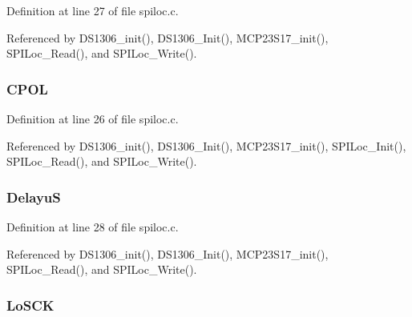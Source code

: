 Definition at line 27 of file spiloc.\-c.



Referenced by D\-S1306\-\_\-init(), D\-S1306\-\_\-\-Init(), M\-C\-P23\-S17\-\_\-init(), S\-P\-I\-Loc\-\_\-\-Read(), and S\-P\-I\-Loc\-\_\-\-Write().

\hypertarget{struct_s_p_i___loc___conf_ac02950660e371880e83d2ed7110e7d2f}{
\subsubsection[{C\-P\-O\-L}]{ C\-P\-O\-L}}\label{struct_s_p_i___loc___conf_ac02950660e371880e83d2ed7110e7d2f}


Definition at line 26 of file spiloc.\-c.



Referenced by D\-S1306\-\_\-init(), D\-S1306\-\_\-\-Init(), M\-C\-P23\-S17\-\_\-init(), S\-P\-I\-Loc\-\_\-\-Init(), S\-P\-I\-Loc\-\_\-\-Read(), and S\-P\-I\-Loc\-\_\-\-Write().

\hypertarget{struct_s_p_i___loc___conf_aec95f2f8e32ea5c1f1e6f84b542f0d75}{
\subsubsection[{Delayu\-S}]{ Delayu\-S}}\label{struct_s_p_i___loc___conf_aec95f2f8e32ea5c1f1e6f84b542f0d75}


Definition at line 28 of file spiloc.\-c.



Referenced by D\-S1306\-\_\-init(), D\-S1306\-\_\-\-Init(), M\-C\-P23\-S17\-\_\-init(), S\-P\-I\-Loc\-\_\-\-Read(), and S\-P\-I\-Loc\-\_\-\-Write().

\hypertarget{struct_s_p_i___loc___conf_aa0bdfb8b19e3ad25df14c908e5e95dc4}{
\subsubsection[{Lo\-S\-C\-K}]{ Lo\-S\-C\-K}}\label{struct_s_p_i___loc___conf_aa0bdfb8b19e3ad25df14c908e5e95dc4}


